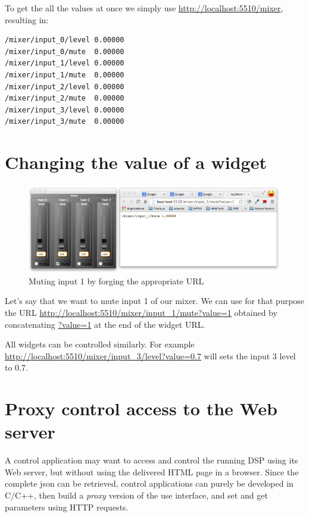 To get the all the values at once we simply use \url{http://localhost:5510/mixer}, resulting in:
\begin{lstlisting}
/mixer/input_0/level 0.00000 
/mixer/input_0/mute  0.00000 
/mixer/input_1/level 0.00000 
/mixer/input_1/mute  0.00000 
/mixer/input_2/level 0.00000 
/mixer/input_2/mute  0.00000 
/mixer/input_3/level 0.00000 
/mixer/input_3/mute  0.00000 
\end{lstlisting}

\section{Changing the value of a widget}

\begin{figure}[h!]
  \centering
  \includegraphics[scale=0.35]{images/mix4-http-mute.png}
  \caption{Muting input 1 by forging the appropriate URL}   
  \label{fig:mix4-http-mute}
\end{figure}

Let's say that we want to mute input 1 of our mixer. We can use for that purpose the URL \url{http://localhost:5510/mixer/input_1/mute?value=1} obtained by concatenating \url{?value=1} at the end of the widget URL. 

All widgets can be controlled similarly. For example \url{http://localhost:5510/mixer/input_3/level?value=0.7} will sets the input 3 level to 0.7.

\section{Proxy control access to the Web server}

A control application may want to access and control the running DSP using its Web server, but without using the delivered HTML page in a browser. Since the complete json can be retrieved,  control applications can purely be developed in C/C++, then build a \textit{proxy} version of the use interface, and set and get parameters using HTTP requests. 

